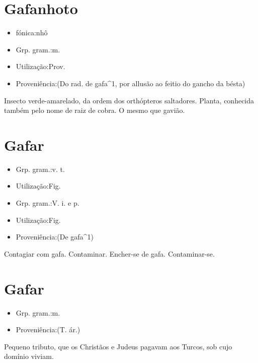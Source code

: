 \section{Gafanhoto}
\begin{itemize}
\item {fónica:nhô}
\end{itemize}
\begin{itemize}
\item {Grp. gram.:m.}
\end{itemize}
\begin{itemize}
\item {Utilização:Prov.}
\end{itemize}
\begin{itemize}
\item {Proveniência:(Do rad. de \textunderscore gafa\textunderscore ^1, por allusão ao feitio do gancho da bésta)}
\end{itemize}
Insecto verde-amarelado, da ordem dos orthópteros saltadores.
Planta, conhecida também pelo nome de \textunderscore raiz de cobra\textunderscore .
O mesmo que \textunderscore gavião\textunderscore .
\section{Gafar}
\begin{itemize}
\item {Grp. gram.:v. t.}
\end{itemize}
\begin{itemize}
\item {Utilização:Fig.}
\end{itemize}
\begin{itemize}
\item {Grp. gram.:V. i.  e  p.}
\end{itemize}
\begin{itemize}
\item {Utilização:Fig.}
\end{itemize}
\begin{itemize}
\item {Proveniência:(De \textunderscore gafa\textunderscore ^1)}
\end{itemize}
Contagiar com gafa.
Contaminar.
Encher-se de gafa.
Contaminar-se.
\section{Gafar}
\begin{itemize}
\item {Grp. gram.:m.}
\end{itemize}
\begin{itemize}
\item {Proveniência:(T. ár.)}
\end{itemize}
Pequeno tributo, que os Christãos e Judeus pagavam aos Turcos, sob cujo domínio viviam.
